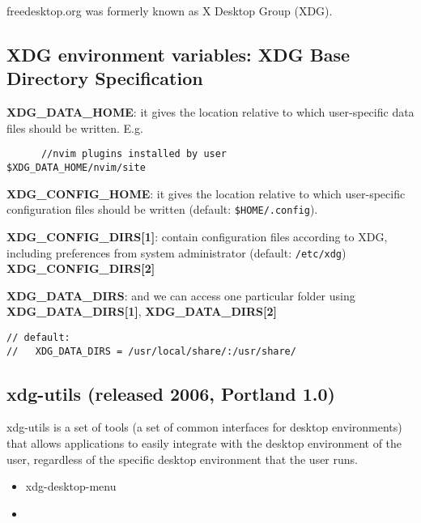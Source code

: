freedesktop.org was formerly known as X Desktop Group (XDG).

\subsection{XDG environment variables: XDG Base Directory Specification }
\label{sec:XDG-environment-variables}

{\bf XDG\_DATA\_HOME}: it gives the location relative to which user-specific
data files should be written. E.g.
\begin{verbatim}
      //nvim plugins installed by user
$XDG_DATA_HOME/nvim/site
\end{verbatim}


{\bf XDG\_CONFIG\_HOME}: it gives the location relative to which user-specific
configuration files should be written (default: \verb!$HOME/.config!).

{\bf XDG\_CONFIG\_DIRS[1]}: contain configuration files according to XDG,
including preferences from system administrator (default: \verb!/etc/xdg!)
{\bf XDG\_CONFIG\_DIRS[2]}

{\bf XDG\_DATA\_DIRS}: and we can access one particular folder using
{\bf XDG\_DATA\_DIRS[1]}, {\bf XDG\_DATA\_DIRS[2]} 
\begin{verbatim}
// default: 
//   XDG_DATA_DIRS = /usr/local/share/:/usr/share/
\end{verbatim}


\subsection{xdg-utils (released 2006, Portland 1.0)}
\label{sec:xdg-utils}
\label{sec:Portland-1.0}



xdg-utils is a set of tools (a set of common interfaces for desktop
environments) that allows applications to easily integrate with the desktop
environment of the user, regardless of the specific desktop environment that the
user runs.

\begin{itemize}
  \item xdg-desktop-menu 
  
  \item 
\end{itemize}





